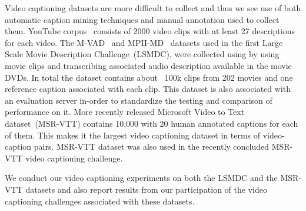 Video captioning datasets are more difficult to collect and thus we see 
use of both automatic caption mining techniques and manual annotation used to
collect them.
YouTube corpus~\cite{chen2011collecting} consists of 2000 video clips with
at least 27 descriptions for each video.
The M-VAD~\cite{rohrbach15cvpr} and MPII-MD~\cite{AtorabiM-VAD2015}
datasets used in the first Large Scale Movie Description Challenge~(LSMDC), were
collected using by using movie clips and transcribing associated audio
description available in the movie DVDs.
In total the dataset contains about ~100k clips from 202 movies and one
reference caption associated with each clip. 
This dataset is also associated with an evaluation server in-order to
standardize the testing and comparison of performance on it.
More recently released Microsoft Video to Text dataset~(MSR-VTT) contains 10,000
with 20 human annotated captions for each of them. 
This makes it the largest video captioning dataset in terms of video-caption
pairs.
MSR-VTT dataset was also used in the recently concluded MSR-VTT video captioning
challenge.

We conduct our video captioning experiments on both the LSMDC and the MSR-VTT
datasets and also report results from our participation of the video captioning
challenges associated with these datasets. 

